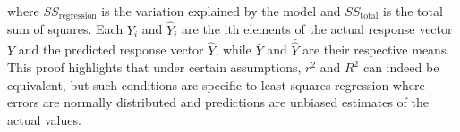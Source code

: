 where \(SS_{\text{regression}}\) is the variation explained by the model and \(SS_{\text{total}}\) is the total sum of squares. Each \(Y_i\) and \(\hat{Y}_i\) are the ith elements of the actual response vector \(Y\) and the predicted response vector \(\hat{Y}\), while \(\bar{Y}\) and \(\bar{\hat{Y}}\) are their respective means. This proof highlights that under certain assumptions, \( r^2 \) and \( R^2 \) can indeed be equivalent, but such conditions are specific to least squares regression where errors are normally distributed and predictions are unbiased estimates of the actual values.
